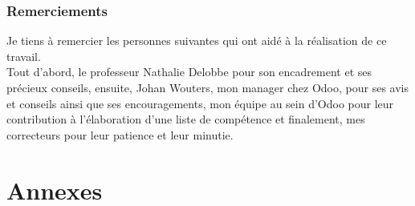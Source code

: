 \documentclass[a4paper,11pt]{report}
\begin{document}
 
\newpage

\hfill\begin{minipage}[c]{0.65\textwidth}

\vspace{5cm}
\section*{Remerciements}
Je tiens à remercier les personnes suivantes qui ont aidé à la réalisation de ce travail. \\ 

Tout d'abord, le professeur Nathalie Delobbe pour son encadrement et ses précieux conseils, ensuite, Johan Wouters, mon manager chez Odoo, pour ses avis et conseils ainsi que ses encouragements, mon équipe au sein d'Odoo pour leur contribution à l'élaboration d'une liste de compétence et finalement, mes correcteurs pour leur patience et leur minutie.
\end{minipage} 
\newpage
\tableofcontents  %

 
 

 



\label{Bibliographie}
 



\part*{Annexes}
\appendix




\end{document}
